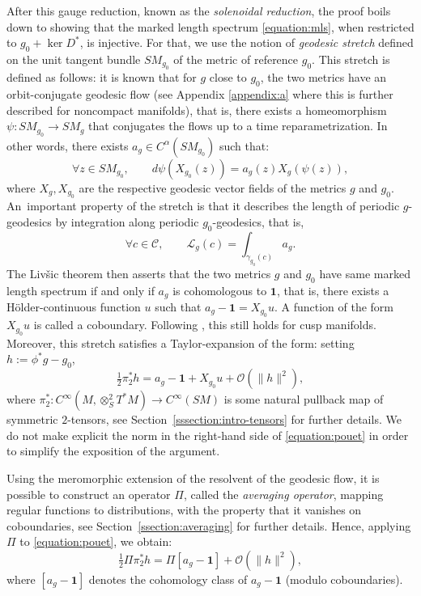 \documentclass[JEP,XML,SOM,Unicode,NoFloatCountersInSection]{cedram}
\newcommand{\mc}{\mathcal}
\theoremstyle{plain}
\theoremstyle{definition}
\begin{document}
After this gauge reduction, known as the \emph{solenoidal reduction}, the proof boils down to showing that the marked length spectrum \eqref{equation:mls}, when restricted to $g_0 + \ker D^*$, is injective. For that, we use the notion of \emph{geodesic stretch} defined on the unit tangent bundle $SM_{g_0}$ of the metric of reference $g_0$. This stretch is defined as follows: it is known that for $g$ close to $g_0$, the two metrics have an orbit-conjugate geodesic flow (see Appendix \ref{appendix:a} where this is further described for noncompact manifolds), that is, there exists a homeomorphism $\psi : SM_{g_0} \to SM_g$ that conjugates the flows up to a time reparametrization. In other words, there exists $a_g \in C^\alpha(SM_{g_0})$ such that:
\[
\forall z \in SM_{g_0}, \qquad d \psi(X_{g_0}(z)) = a_g(z) X_g(\psi(z)),
\]
where $X_g,X_{g_0}$ are the respective geodesic vector fields of the metrics $g$ and $g_0$. An~important property of the stretch is that it describes the length of periodic $g$-geodesics by integration along periodic $g_0$-geodesics, that is,
\[
\forall c \in \mc{C}, \qquad \mc{L}_g(c) = \int_{\gamma_{g_0}(c)} a_g.
\]
The Liv\v{s}ic theorem \cite{Livsic-72} then asserts that the two metrics $g$ and $g_0$ have same marked length spectrum if and only if $a_g$ is cohomologous to $\mathbf{1}$, that is, there exists a Hölder-continuous function $u$ such that $a_g - \mathbf{1}=X_{g_0}u$. A function of the form $X_{g_0}u$ is called a coboundary. Following \cite{Bonthonneau-Lefeuvre-19-1}, this still holds for cusp manifolds. Moreover, this stretch satisfies a Taylor-expansion of the form: setting $h := \phi^*g-g_0$,
\begin{equation}
\label{equation:pouet}
\tfrac{1}{2} \pi^*_2 h = a_g-\mathbf{1} + X_{g_0} u + \mc{O}(\|h\|^2),
\end{equation}
where $\pi_2^* : C^\infty(M,\otimes^2_S T^*M) \to C^\infty(SM)$ is some natural pullback map of symmetric $2$-tensors, see Section~\ref{sssection:intro-tensors} for further details.
We do not make explicit the norm in the right-hand side of \eqref{equation:pouet} in order to simplify the exposition of the argument.

Using the meromorphic extension of the resolvent of the geodesic flow, it is possible to construct an operator $\Pi$, called the \emph{averaging operator}, mapping regular functions to distributions, with the property that it vanishes on coboundaries, see Section~\ref{ssection:averaging} for further details. Hence, applying $\Pi$ to \eqref{equation:pouet}, we obtain:
\[
\tfrac{1}{2} \Pi \pi_2^* h = \Pi [a_g-\mathbf{1}] + \mc{O}(\|h\|^2),
\]
where $[a_g-\mathbf{1}]$ denotes the cohomology class of $a_g - \mathbf{1}$ (modulo coboundaries).
\end{document}

